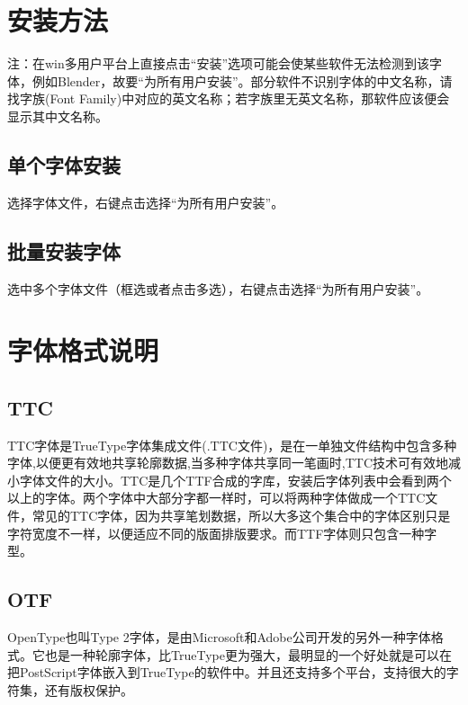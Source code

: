 \documentclass{../../PublicResources/DocClass}
\begin{document}
    \maketitle
    \frontmatter
    \clearpage
    
    \clearpage
    {\centering \tableofcontents} %
    \mainmatter

    \chapter{安装方法}
    注：在win多用户平台上直接点击“安装”选项可能会使某些软件无法检测到该字体，例如Blender，故要“为所有用户安装”。部分软件不识别字体的中文名称，请找字族(Font Family)中对应的英文名称；若字族里无英文名称，那软件应该便会显示其中文名称。
    \section{单个字体安装}
    选择字体文件，右键点击选择“为所有用户安装”。
    \section{批量安装字体}
    选中多个字体文件（框选或者点击多选），右键点击选择“为所有用户安装”。

    \chapter{字体格式说明}
    \section{TTC}
    TTC字体是TrueType字体集成文件(.TTC文件)，是在一单独文件结构中包含多种字体,以便更有效地共享轮廓数据,当多种字体共享同一笔画时,TTC技术可有效地减小字体文件的大小。TTC是几个TTF合成的字库，安装后字体列表中会看到两个以上的字体。两个字体中大部分字都一样时，可以将两种字体做成一个TTC文件，常见的TTC字体，因为共享笔划数据，所以大多这个集合中的字体区别只是字符宽度不一样，以便适应不同的版面排版要求。而TTF字体则只包含一种字型。

    \section{OTF}
    OpenType也叫Type 2字体，是由Microsoft和Adobe公司开发的另外一种字体格式。它也是一种轮廓字体，比TrueType更为强大，最明显的一个好处就是可以在把PostScript字体嵌入到TrueType的软件中。并且还支持多个平台，支持很大的字符集，还有版权保护。
\end{document}

